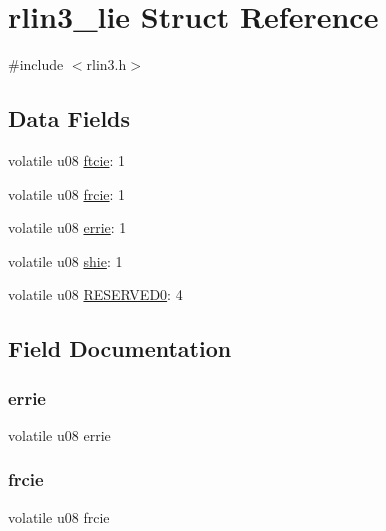 \hypertarget{structrlin3__lie}{}\section{rlin3\+\_\+lie Struct Reference}
\label{structrlin3__lie}


{\ttfamily \#include $<$rlin3.\+h$>$}

\subsection*{Data Fields}
\begin{DoxyCompactItemize}
\item 
volatile u08 \mbox{\hyperlink{structrlin3__lie_a748506f66ad585f6e6144394821d50c7}{ftcie}}\+: 1
\item 
volatile u08 \mbox{\hyperlink{structrlin3__lie_a84b4428ada685689ec8ff3ebe006bb6f}{frcie}}\+: 1
\item 
volatile u08 \mbox{\hyperlink{structrlin3__lie_aedf8d7b4d905c5158f1ecc46564ecdf5}{errie}}\+: 1
\item 
volatile u08 \mbox{\hyperlink{structrlin3__lie_a403584ca01a1fd13c7e9cb9aa5203203}{shie}}\+: 1
\item 
volatile u08 \mbox{\hyperlink{structrlin3__lie_a59c0b30ccfb89f1b34e9682741859abd}{R\+E\+S\+E\+R\+V\+E\+D0}}\+: 4
\end{DoxyCompactItemize}


\subsection{Field Documentation}
\mbox{\label{structrlin3__lie_aedf8d7b4d905c5158f1ecc46564ecdf5}} 
\subsubsection{\texorpdfstring{errie}{errie}}
{\footnotesize\ttfamily volatile u08 errie}

\mbox{\label{structrlin3__lie_a84b4428ada685689ec8ff3ebe006bb6f}} 
\subsubsection{\texorpdfstring{frcie}{frcie}}
{\footnotesize\ttfamily volatile u08 frcie}

